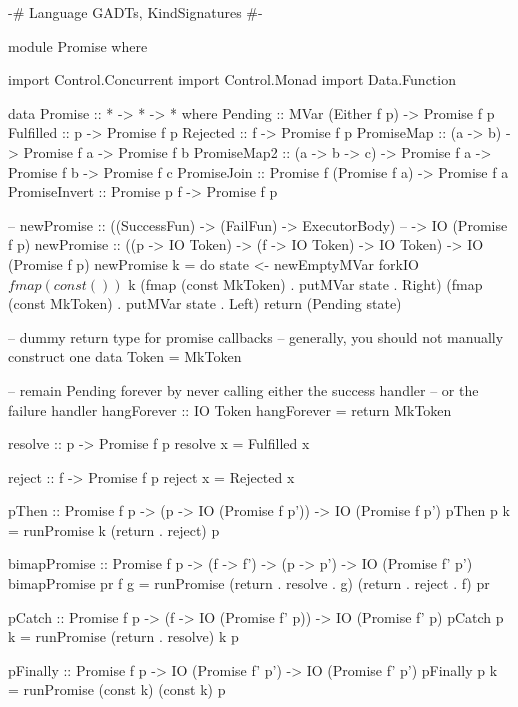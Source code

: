 \documentclass[12pt, english, letterpaper]{kuthesis}
\begin{document}
\begin{code}[samepage=false,numbers=left,frame=leftline]
{-# Language GADTs, KindSignatures #-}

module Promise where

import Control.Concurrent
import Control.Monad
import Data.Function

data Promise :: * -> * -> * where
  Pending :: MVar (Either f p) -> Promise f p
  Fulfilled :: p -> Promise f p
  Rejected :: f -> Promise f p
  PromiseMap :: (a -> b) -> Promise f a -> Promise f b
  PromiseMap2 :: (a -> b -> c) -> Promise f a -> Promise f b
                 -> Promise f c
  PromiseJoin :: Promise f (Promise f a) -> Promise f a
  PromiseInvert :: Promise p f -> Promise f p

-- newPromise :: ((SuccessFun) -> (FailFun) -> ExecutorBody)
--               -> IO (Promise f p)
newPromise :: ((p -> IO Token) -> (f -> IO Token) -> IO Token)
              -> IO (Promise f p)
newPromise k = do
  state <- newEmptyMVar
  forkIO $ fmap (const ()) $ k (fmap (const MkToken)
                                     . putMVar state . Right)
                               (fmap (const MkToken)
                                     . putMVar state . Left)
  return (Pending state)

-- dummy return type for promise callbacks
-- generally, you should not manually construct one
data Token = MkToken

-- remain Pending forever by never calling either the success handler
--   or the failure handler
hangForever :: IO Token
hangForever = return MkToken

resolve :: p -> Promise f p
resolve x = Fulfilled x

reject :: f -> Promise f p
reject x = Rejected x

pThen :: Promise f p
        -> (p -> IO (Promise f p'))
        -> IO (Promise f p')
pThen p k = runPromise k (return . reject) p


bimapPromise :: Promise f p -> (f -> f') -> (p -> p')
                -> IO (Promise f' p')
bimapPromise pr f g = runPromise (return . resolve . g)
                                 (return . reject  . f) pr

pCatch :: Promise f p
        -> (f -> IO (Promise f' p))
        -> IO (Promise f' p)
pCatch p k = runPromise (return . resolve) k p

pFinally :: Promise f p
         -> IO (Promise f' p')
         -> IO (Promise f' p')
pFinally p k = runPromise (const k) (const k) p


\end{code}
\end{document}
